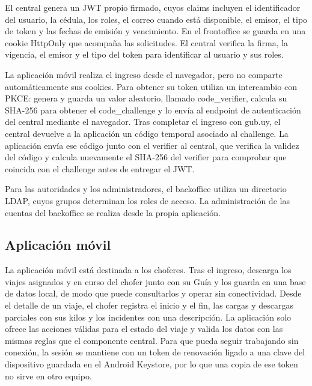 El central genera un JWT propio firmado, cuyos claims incluyen el identificador del usuario, la cédula, los roles, el correo cuando está disponible, el emisor, el tipo de token y las fechas de emisión y vencimiento. En el frontoffice se guarda en una cookie HttpOnly que acompaña las solicitudes. El central verifica la firma, la vigencia, el emisor y el tipo del token para identificar al usuario y sus roles.

La aplicación móvil realiza el ingreso desde el navegador, pero no comparte automáticamente sus cookies. Para obtener su token utiliza un intercambio con PKCE: genera y guarda un valor aleatorio, llamado code\_verifier, calcula su SHA-256 para obtener el code\_challenge y lo envía al endpoint de autenticación del central mediante el navegador. Tras completar el ingreso con gub.uy, el central devuelve a la aplicación un código temporal asociado al challenge. La aplicación envía ese código junto con el verifier al central, que verifica la validez del código y calcula nuevamente el SHA-256 del verifier para comprobar que coincida con el challenge antes de entregar el JWT.

Para las autoridades y los administradores, el backoffice utiliza un directorio LDAP, cuyos grupos determinan los roles de acceso. La administración de las cuentas del backoffice se realiza desde la propia aplicación.

\subsection{Aplicación móvil}
La aplicación móvil está destinada a los choferes. Tras el ingreso, descarga los viajes asignados y en curso del chofer junto con su Guía y los guarda en una base de datos local, de modo que puede consultarlos y operar sin conectividad. Desde el detalle de un viaje, el chofer registra el inicio y el fin, las cargas y descargas parciales con sus kilos y los incidentes con una descripción. La aplicación solo ofrece las acciones válidas para el estado del viaje y valida los datos con las mismas reglas que el componente central. Para que pueda seguir trabajando sin conexión, la sesión se mantiene con un token de renovación ligado a una clave del dispositivo guardada en el Android Keystore, por lo que una copia de ese token no sirve en otro equipo.

